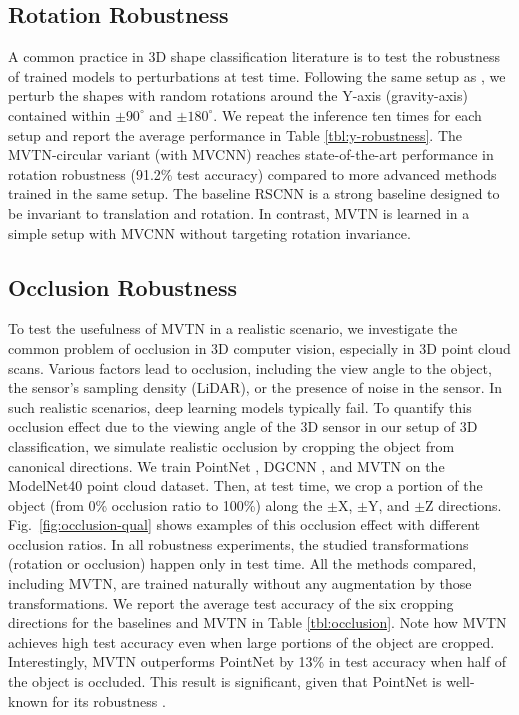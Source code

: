 \documentclass[10pt,twocolumn,letterpaper]{article}
\newcommand{\figLabel}{Fig.~}
\begin{document}
\subsection{Rotation Robustness} \label{sec:exp-robust}
\vspace{-4pt}
A common practice in 3D shape classification literature is to test the robustness of trained models to perturbations at test time. Following the same setup as \cite{rspointcloud,sada}, we perturb the shapes with random rotations around the Y-axis (gravity-axis) contained within $\pm90^\circ$ and $\pm180^\circ$. 
We repeat the inference ten times for each setup and report the average performance in Table \ref{tbl:y-robustness}. The MVTN-circular variant (with MVCNN) reaches state-of-the-art performance in rotation robustness (91.2\% test accuracy) compared to more advanced methods trained in the same setup. The baseline RSCNN \cite{rspointcloud} is a strong baseline designed to be invariant to translation and rotation. In contrast, MVTN is learned in a simple setup with MVCNN without targeting rotation invariance.


\subsection{Occlusion Robustness} \label{sec:occlusion}
\vspace{-4pt}
To test the usefulness of MVTN in a realistic scenario, we investigate the common problem of occlusion in 3D computer vision, especially in 3D point cloud scans. Various factors lead to occlusion, including the view angle to the object, the sensor's sampling density (\eg LiDAR), or the presence of noise in the sensor. In such realistic scenarios, deep learning models typically fail. To quantify this occlusion effect due to the viewing angle of the 3D sensor in our setup of 3D classification, we simulate realistic occlusion by cropping the object from canonical directions. We train PointNet \cite{pointnet}, DGCNN \cite{dgcn}, and MVTN on the ModelNet40 point cloud dataset. Then, at test time, we crop a portion of the object (from 0\% occlusion ratio to 100\%) along the $\pm$X, $\pm$Y, and $\pm$Z directions. \figLabel{\ref{fig:occlusion-qual}} shows examples of this occlusion effect with different occlusion ratios. In all robustness experiments, the studied transformations (rotation or occlusion) happen only in test time. All the methods compared, including MVTN, are trained naturally without any augmentation by those transformations. We report the average test accuracy of the six cropping directions for the baselines and MVTN in Table \ref{tbl:occlusion}. Note how MVTN achieves high test accuracy even when large portions of the object are cropped. Interestingly, MVTN outperforms PointNet \cite{pointnet} by 13\% in test accuracy when half of the object is occluded. This result is significant, given that PointNet is well-known for its robustness \cite{pointnet,advpc}. 
\end{document}
